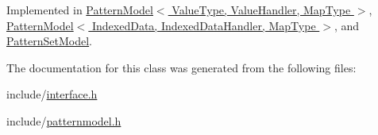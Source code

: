 Implemented in \hyperlink{classPatternModel_af5df3d30417804589c552320add3285a}{Pattern\+Model$<$ Value\+Type, Value\+Handler, Map\+Type $>$}, \hyperlink{classPatternModel_af5df3d30417804589c552320add3285a}{Pattern\+Model$<$ Indexed\+Data, Indexed\+Data\+Handler, Map\+Type $>$}, and \hyperlink{classPatternSetModel_a178d3c988a43130b4ba3d4fa57001055}{Pattern\+Set\+Model}.



The documentation for this class was generated from the following files\+:\begin{DoxyCompactItemize}
\item 
include/\hyperlink{interface_8h}{interface.\+h}\item 
include/\hyperlink{patternmodel_8h}{patternmodel.\+h}\end{DoxyCompactItemize}
